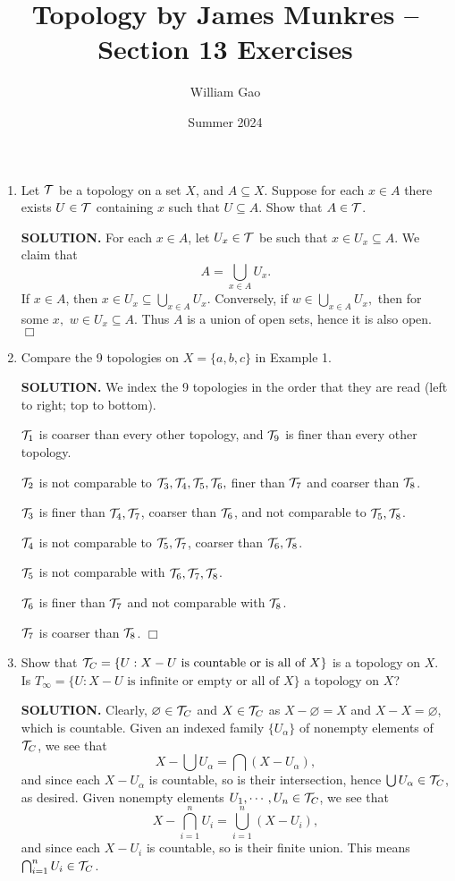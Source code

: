 \documentclass{article}
\title{Topology by James Munkres -- Section 13 Exercises}
\author{William Gao}
\date{Summer 2024}
\begin{document}
\maketitle
\begin{enumerate}
    \item Let $\mathcal{T}$ be a topology on a set $X$, and $A \subseteq X$. Suppose for each $x \in A$ there exists $U \in \mathcal{T}$ containing $x$ such that $U \subseteq A$. Show that $A \in \mathcal{T}$.

    {\bf SOLUTION.} For each $x \in A$, let $U_x \in \mathcal{T}$ be such that $x \in U_x \subseteq A$. We claim that
    $$A = \bigcup_{x\in A} U_x.$$
    If $x \in A$, then $x \in U_x \subseteq \bigcup_{x\in A} U_x$. Conversely, if $w \in \bigcup_{x\in A} U_x,$ then for some $x,$ $w \in U_x \subseteq A$. Thus $A$ is a union of open sets, hence it is also open. $\Box$

    \item Compare the 9 topologies on $X = \{a, b, c\}$ in Example 1. 

    {\bf SOLUTION.} We index the 9 topologies in the order that they are read (left to right; top to bottom).

    $\mathcal{T}_1$ is coarser than every other topology, and $\mathcal{T}_9$ is finer than every other topology.

    $\mathcal{T}_2$ is not comparable to $\mathcal{T}_3, \mathcal{T}_4, \mathcal{T}_5, \mathcal{T}_6,$ finer than $\mathcal{T}_7$ and coarser than $\mathcal{T}_8$.

    $\mathcal{T}_3$ is finer than $\mathcal{T}_4, \mathcal{T}_7$, coarser than $\mathcal{T}_6$, and not comparable to $\mathcal{T}_5, \mathcal{T}_8$.

    $\mathcal{T}_4$ is not comparable to $\mathcal{T}_5, \mathcal{T}_7$, coarser than $\mathcal{T}_6, \mathcal{T}_8$.

    $\mathcal{T}_5$ is not comparable with $\mathcal{T}_6, \mathcal{T}_7, \mathcal{T}_8$.

    $\mathcal{T}_6$ is finer than $\mathcal{T}_7$ and not comparable with $\mathcal{T}_8$.

    $\mathcal{T}_7$ is coarser than $\mathcal{T}_8$. $\Box$
    
    \item Show that $\mathcal{T}_C = \{U: X - U \text{ is countable or is all of } X\}$ is a topology on $X$. Is $T_\infty = \{U : X - U \text{ is infinite or empty or all of } X\}$ a topology on $X$?

    {\bf SOLUTION.} Clearly, $\varnothing \in \mathcal{T}_C$ and $X \in \mathcal{T}_C$ as $X - \varnothing = X$ and $X - X = \varnothing$, which is countable. Given an indexed family $\{U_\alpha\}$ of nonempty elements of $\mathcal{T}_C$, we see that
    $$X - \bigcup U_\alpha = \bigcap (X - U_\alpha),$$
    and since each $X - U_\alpha$ is countable, so is their intersection, hence $\bigcup U_\alpha \in \mathcal{T}_C$, as desired. Given nonempty elements $U_1, \cdots, U_n \in \mathcal{T}_C$, we see that
    $$X - \bigcap_{i=1}^n U_i = \bigcup_{i=1}^n (X - U_i),$$
    and since each $X-U_i$ is countable, so is their finite union. This means $\bigcap_{i=1}^n U_i \in \mathcal{T}_C$.


\end{enumerate}
\end{document}
